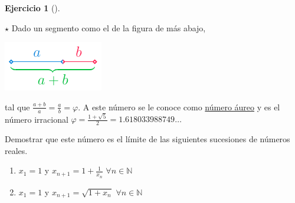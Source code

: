 \documentclass[
  a4paper,
]{scrreport}
\providecommand{\tightlist}{%
  \setlength{\itemsep}{0pt}\setlength{\parskip}{0pt}}\usepackage{longtable,booktabs,array}
\theoremstyle{definition}
\newtheorem{exercise}{Ejercicio}[chapter]
\theoremstyle{remark}
\begin{document}
\leavevmode{}%
\begin{exercise}[]\label{exr-numero-aureo}

\(\star\) Dado un segmento como el de la figura de más abajo,

\includegraphics{././img/sucesiones/numero-aureo.png}

tal que \(\frac{a+b}{a}=\frac{a}{b}=\varphi\). A este número se le
conoce como
\href{https://es.wikipedia.org/wiki/N\%C3\%BAmero_\%C3\%A1ureo}{número
áureo} y es el número irracional
\(\varphi=\frac{1+\sqrt{5}}{2}=1.618033988749\ldots\)

Demostrar que este número es el límite de las siguientes sucesiones de
números reales.

\begin{enumerate}
\def\labelenumi{\alph{enumi}.}
\tightlist
\item
  \(x_1=1\) y \(x_{n+1}=1+\frac{1}{x_n}\) \(\forall n\in \mathbb{N}\)
\item
  \(x_1=1\) y \(x_{n+1}=\sqrt{1+x_n}\) \(\forall n\in\mathbb{N}\)
\end{enumerate}

\end{exercise}
\end{document}
